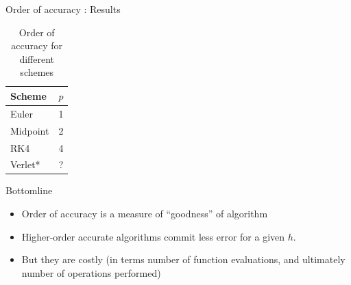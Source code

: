 \documentclass[presentation]{beamer}
\begin{document}
\begin{frame}[label={sec:org127ad97}]{Order of accuracy : Results}
\begin{table}[htbp]
\caption{\label{tab_sym_snake_params}
Order of accuracy for different schemes}
\centering
\begin{tabular}{lr}
\toprule
Scheme & \(p\)\\
\midrule
Euler & 1\\
Midpoint & 2\\
RK4 & 4\\
Verlet* & ?\\
\bottomrule
\end{tabular}
\end{table}
\end{frame}
\begin{frame}[label={sec:orgad94049}]{Bottomline}
\begin{itemize}
\item Order of accuracy is a measure of ``goodness'' of algorithm
\item Higher-order accurate algorithms commit less error for a given \(h\).
\item But they are costly (in terms number of function evaluations, and
ultimately number of operations performed)
\end{itemize}
\end{frame}
\end{document}
